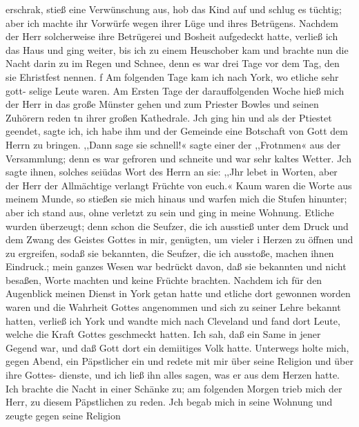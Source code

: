 erschrak, stieß eine Verwünschung aus, hob das Kind auf und
schlug es tüchtig; aber ich machte ihr Vorwürfe wegen ihrer
Lüge und ihres Betrügens. Nachdem der Herr solcherweise ihre
Betrügerei und Bosheit aufgedeckt hatte, verließ ich das Haus
und ging weiter, bis ich zu einem Heuschober kam und brachte
nun die Nacht darin zu im Regen und Schnee, denn es war
drei Tage vor dem Tag, den sie Ehristfest nennen.
f Am folgenden Tage kam ich nach York, wo etliche sehr gott-
selige Leute waren. Am Ersten Tage der darauffolgenden
Woche hieß mich der Herr in das große Münster gehen und zum
Priester Bowles und seinen Zuhörern reden tn ihrer großen
Kathedrale. Jch ging hin und als der Ptiestet geendet, sagte ich,
ich habe ihm und der Gemeinde eine Botschaft von Gott dem
Herrn zu bringen. ,,Dann sage sie schnell!« sagte einer der
,,Frotnmen« aus der Versammlung; denn es war gefroren und
schneite und war sehr kaltes Wetter. Jch sagte ihnen, solches
seiüdas Wort des Herrn an sie: ,,Jhr lebet in Worten, aber der
Herr der Allmächtige verlangt Früchte von euch.« Kaum waren
die Worte aus meinem Munde, so stießen sie mich hinaus und
warfen mich die Stufen hinunter; aber ich stand aus, ohne verletzt
zu sein und ging in meine Wohnung. Etliche wurden überzeugt;
denn schon die Seufzer, die ich ausstieß unter dem Druck und
dem Zwang des Geistes Gottes in mir, genügten, um vieler
i Herzen zu öffnen und zu ergreifen, sodaß sie bekannten, die Seufzer,
die ich ausstoße, machen ihnen Eindruck.; mein ganzes Wesen
war bedrückt davon, daß sie bekannten und nicht besaßen, Worte
machten und keine Früchte brachten.
Nachdem ich für den Augenblick meinen Dienst in York getan
hatte und etliche dort gewonnen worden waren und die Wahrheit
Gottes angenommen und sich zu seiner Lehre bekannt hatten,
verließ ich York und wandte mich nach Cleveland und fand dort
Leute, welche die Kraft Gottes geschmeckt hatten. Ich sah, daß
ein Same in jener Gegend war, und daß Gott dort ein demiitiges
Volk hatte. Unterwegs holte mich, gegen Abend, ein Päpstlicher
ein und redete mit mir über seine Religion und über ihre Gottes-
dienste, und ich ließ ihn alles sagen, was er aus dem Herzen
hatte. Ich brachte die Nacht in einer Schänke zu; am folgenden
Morgen trieb mich der Herr, zu diesem Päpstlichen zu reden. Jch
begab mich in seine Wohnung und zeugte gegen seine Religion


